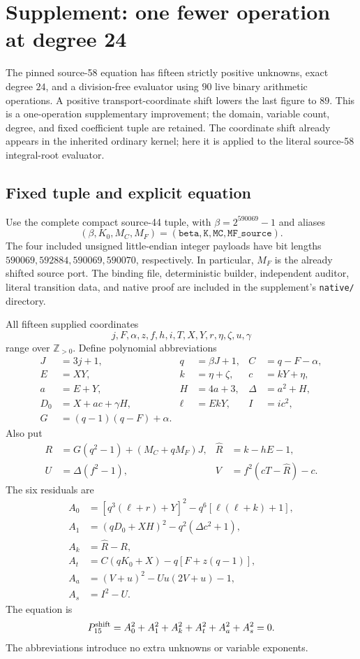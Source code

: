 \section{Supplement: one fewer operation at degree 24}
\label{sec:supplement-fifteen}

The pinned source-58 equation has fifteen strictly positive unknowns,
exact degree $24$, and a division-free evaluator using $90$ live binary
arithmetic operations. A positive transport-coordinate shift lowers the
last figure to $89$. This is a one-operation supplementary improvement;
the domain, variable count, degree, and fixed coefficient tuple are retained.
The coordinate shift already appears in the inherited ordinary kernel;
here it is applied to the literal source-58 integral-root evaluator.

\subsection{Fixed tuple and explicit equation}

Use the complete compact source-44 tuple, with
$\beta=2^{590069}-1$ and aliases
\[
 (\beta,K_0,M_C,M_F)=(\texttt{beta},\texttt{K},
                       \texttt{MC},\texttt{MF\_source}).
\]
The four included unsigned little-endian integer payloads have bit lengths
$590069,592884,590069,590070$, respectively. In particular, $M_F$ is the
already shifted source port. The binding file, deterministic builder,
independent auditor, literal transition data, and native proof are included
in the supplement's \texttt{native/} directory.

All fifteen supplied coordinates
\[
 j,F,\alpha,z,f,h,i,T,X,Y,r,\eta,\zeta,u,\gamma
\]
range over $\mathbb Z_{>0}$. Define polynomial abbreviations
\begin{align*}
 J&=3j+1,& q&=\beta J+1,& C&=q-F-\alpha,\\
 E&=XY,& k&=\eta+\zeta,& c&=kY+\eta,\\
 a&=E+Y,& H&=4a+3,& \Delta&=a^2+H,\\
 D_0&=X+ac+\gamma H,& \ell&=EkY,& I&=ic^2,\\
 G&=(q-1)(q-F)+\alpha.&&&
\end{align*}
Also put
\begin{align*}
 R&=G(q^2-1)+(M_C+qM_F)J,&
 \widehat R&=k-hE-1,\\
 U&=\Delta(f^2-1),& V&=f^2(cT-\widehat R)-c.
\end{align*}
The six residuals are
\begin{align*}
 A_0&=[q^3(\ell+r)+Y]^2-q^6[\ell(\ell+k)+1],\\
 A_1&=(qD_0+XH)^2-q^2(\Delta c^2+1),\\
 A_k&=\widehat R-R,\\
 A_t&=C(qK_0+X)-q[F+z(q-1)],\\
 A_a&=(V+u)^2-Uu(2V+u)-1,\\
 A_s&=I^2-U.
\end{align*}
The equation is
\[
 P_{15}^{\rm shift}
   =A_0^2+A_1^2+A_k^2+A_t^2+A_a^2+A_s^2=0.
\]
The abbreviations introduce no extra unknowns or variable exponents.

